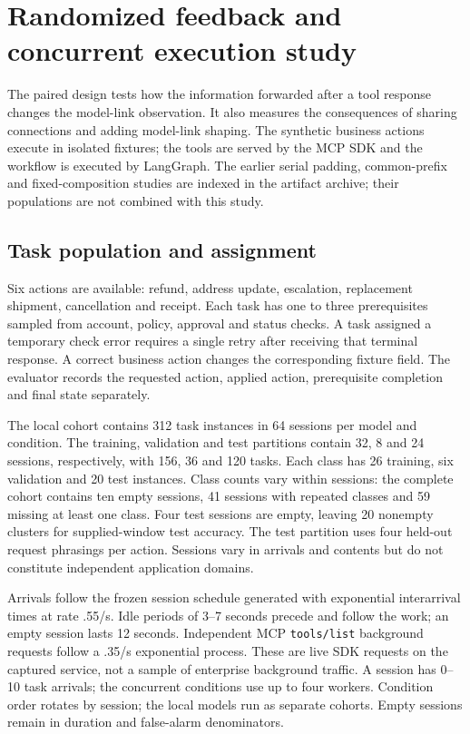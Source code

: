 \section{Randomized feedback and concurrent execution study}\label{supp:randomized-feedback}
The paired design tests how the information forwarded after a tool response changes the model-link observation. It also measures the consequences of sharing connections and adding model-link shaping. The synthetic business actions execute in isolated fixtures; the tools are served by the MCP SDK and the workflow is executed by LangGraph. The earlier serial padding, common-prefix and fixed-composition studies are indexed in the artifact archive; their populations are not combined with this study.

\subsection{Task population and assignment}
Six actions are available: refund, address update, escalation, replacement shipment, cancellation and receipt. Each task has one to three prerequisites sampled from account, policy, approval and status checks. A task assigned a temporary check error requires a single retry after receiving that terminal response. A correct business action changes the corresponding fixture field. The evaluator records the requested action, applied action, prerequisite completion and final state separately.

The local cohort contains 312 task instances in 64 sessions per model and condition. The training, validation and test partitions contain 32, 8 and 24 sessions, respectively, with 156, 36 and 120 tasks. Each class has 26 training, six validation and 20 test instances. Class counts vary within sessions: the complete cohort contains ten empty sessions, 41 sessions with repeated classes and 59 missing at least one class. Four test sessions are empty, leaving 20 nonempty clusters for supplied-window test accuracy. The test partition uses four held-out request phrasings per action. Sessions vary in arrivals and contents but do not constitute independent application domains.

Arrivals follow the frozen session schedule generated with exponential interarrival times at rate .55/s. Idle periods of 3--7 seconds precede and follow the work; an empty session lasts 12 seconds. Independent MCP \texttt{tools/list} background requests follow a .35/s exponential process. These are live SDK requests on the captured service, not a sample of enterprise background traffic. A session has 0--10 task arrivals; the concurrent conditions use up to four workers. Condition order rotates by session; the local models run as separate cohorts. Empty sessions remain in duration and false-alarm denominators.

